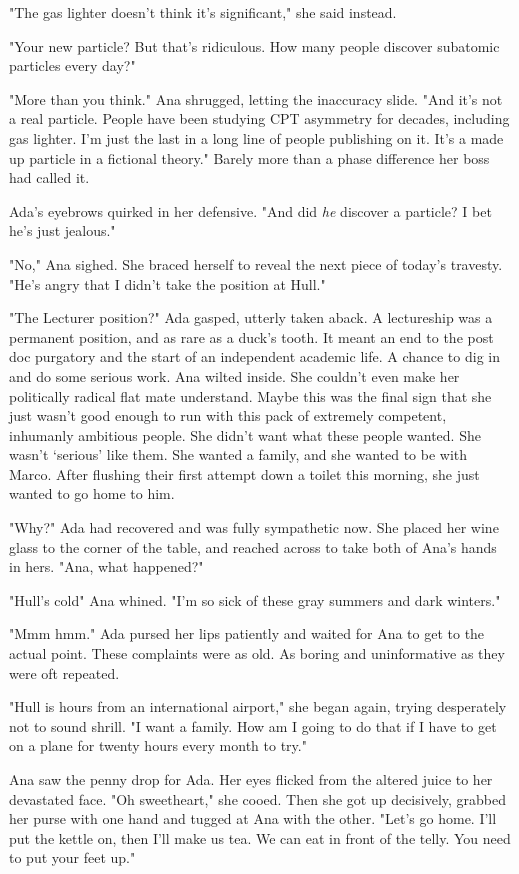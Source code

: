\documentclass{article}
\begin{document}
"The gas lighter doesn't think it’s significant," she said instead.

"Your new particle? But that's ridiculous. How many people discover subatomic particles every day?"

"More than you think." Ana shrugged, letting the inaccuracy slide. "And it’s not a real particle. People have been studying CPT asymmetry for decades, including gas lighter. I'm just the last in a long line of people publishing on it. It’s a made up particle in a fictional theory." Barely more than a phase difference her boss had called it.

Ada's eyebrows quirked in her defensive. "And did \emph{he} discover a particle? I bet he's just jealous."

"No," Ana sighed. She braced herself to reveal the next piece of today's travesty. "He's angry that I didn't take the position at Hull."

"The Lecturer position?" Ada gasped, utterly taken aback. A lectureship was a permanent position, and as rare as a duck's tooth. It meant an end to the post doc purgatory and the start of an independent academic life. A chance to dig in and do some serious work. Ana wilted inside. She couldn't even make her politically radical flat mate understand. Maybe this was the final sign that she just wasn't good enough to run with this pack of extremely competent, inhumanly ambitious people. She didn't want what these people wanted. She wasn't `serious' like them. She wanted a family, and she wanted to be with Marco. After flushing their first attempt down a toilet this morning, she just wanted to go home to him. 

"Why?" Ada had recovered and was fully sympathetic now. She placed her wine glass to the corner of the table, and reached across to take both of Ana's hands in hers. "Ana, what happened?"

"Hull's cold" Ana whined. "I'm so sick of these gray summers and dark winters." 

"Mmm hmm." Ada pursed her lips patiently and waited for Ana to get to the actual point. These complaints were as old. As boring and uninformative as they were oft repeated.

"Hull is hours from an international airport," she began again, trying desperately not to sound shrill. "I want a family. How am I going to do that if I have to get on a plane for twenty hours every month to try."

Ana saw the penny drop for Ada. Her eyes flicked from the altered juice to her devastated face. "Oh sweetheart," she cooed. Then she got up decisively, grabbed her purse with one hand and tugged at Ana with the other. "Let's go home. I'll put the kettle on, then I'll make us tea. We can eat in front of the telly. You need to put your feet up."
\end{document}
